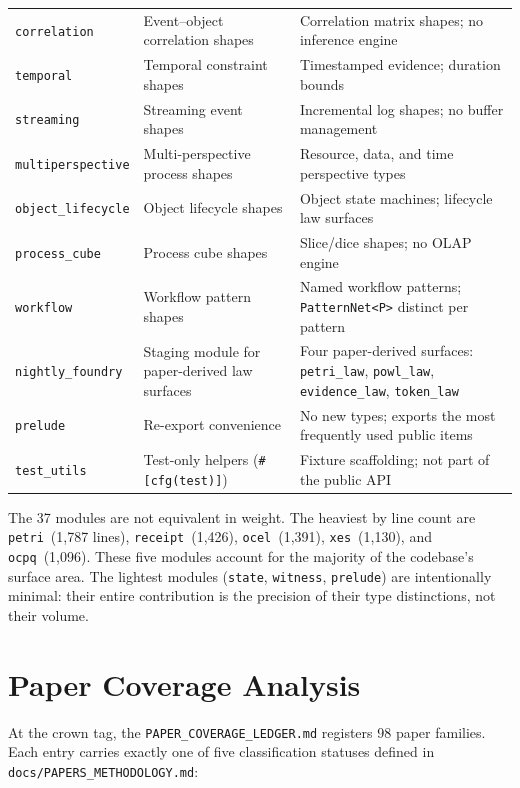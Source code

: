 \begin{longtable}{@{}lp{4.8cm}p{5.0cm}@{}}
\texttt{correlation}    & Event--object correlation shapes & Correlation matrix shapes; no inference engine \\
\texttt{temporal}       & Temporal constraint shapes & Timestamped evidence; duration bounds \\
\texttt{streaming}      & Streaming event shapes & Incremental log shapes; no buffer management \\
\texttt{multiperspective} & Multi-perspective process shapes & Resource, data, and time perspective types \\
\texttt{object\_lifecycle} & Object lifecycle shapes & Object state machines; lifecycle law surfaces \\
\texttt{process\_cube}  & Process cube shapes & Slice/dice shapes; no OLAP engine \\
\texttt{workflow}       & Workflow pattern shapes & Named workflow patterns; \texttt{PatternNet<P>} distinct per pattern \\
\texttt{nightly\_foundry} & Staging module for paper-derived law surfaces & Four paper-derived surfaces: \texttt{petri\_law}, \texttt{powl\_law}, \texttt{evidence\_law}, \texttt{token\_law} \\
\texttt{prelude}        & Re-export convenience & No new types; exports the most frequently used public items \\
\texttt{test\_utils}    & Test-only helpers (\texttt{\#[cfg(test)]}) & Fixture scaffolding; not part of the public API \\
\end{longtable}

The 37 modules are not equivalent in weight. The heaviest by line count are
\texttt{petri}~(1,787 lines), \texttt{receipt}~(1,426), \texttt{ocel}~(1,391),
\texttt{xes}~(1,130), and \texttt{ocpq}~(1,096). These five modules account for
the majority of the codebase's surface area. The lightest modules (\texttt{state},
\texttt{witness}, \texttt{prelude}) are intentionally minimal: their entire
contribution is the precision of their type distinctions, not their volume.

\section{Paper Coverage Analysis}
\label{sec:crown-papers}

At the crown tag, the \texttt{PAPER\_COVERAGE\_LEDGER.md} registers 98 paper
families. Each entry carries exactly one of five classification statuses defined
in \texttt{docs/PAPERS\_METHODOLOGY.md}:

